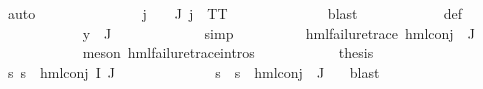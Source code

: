\begin{isabellebody}
\ auto\isanewline
\ \ \ \ \ \ \ \ \isamarkupfalse%
\ {\isachardoublequoteopen}{\isasymPsi}\ {\isacharbackquote}{\kern0pt}\ {\isacharbraceleft}{\kern0pt}{\isacharbraceright}{\kern0pt}\ {\isacharequal}{\kern0pt}\ {\isacharbraceleft}{\kern0pt}{\isacharbraceright}{\kern0pt}{\isachardoublequoteclose}\ {\isachardoublequoteopen}{\isasymforall}j\ {\isasymin}\ {\isasymPsi}\ {\isacharbackquote}{\kern0pt}\ J{\isachardot}{\kern0pt}\ j\ {\isacharequal}{\kern0pt}\ TT{\isachardoublequoteclose}\ \isanewline
\ \ \ \ \ \ \ \ \ \ \ \isamarkupfalse%
\ blast\isanewline
\ \ \ \ \ \ \ \ \ \ \isamarkupfalse%
\ {\isasymPsi}{\isacharunderscore}{\kern0pt}def\ \isanewline
\ \ \ \ \ \ \ \ \ \ \isamarkupfalse%
\ {\isacartoucheopen}y\ {\isasymin}\ {\isasymPhi}{\isacharbackquote}{\kern0pt}J{\isacartoucheclose}\ \isanewline
\ \ \ \ \ \ \ \ \ \ \isamarkupfalse%
\ simp\isanewline
\ \ \ \ \ \ \ \ \isamarkupfalse%
\ {\isachardoublequoteopen}hml{\isacharunderscore}{\kern0pt}failure{\isacharunderscore}{\kern0pt}trace\ {\isacharparenleft}{\kern0pt}hml{\isacharunderscore}{\kern0pt}conj\ {\isacharbraceleft}{\kern0pt}{\isacharbraceright}{\kern0pt}\ J\ {\isasymPsi}{\isacharparenright}{\kern0pt}{\isachardoublequoteclose}\ \isanewline
\ \ \ \ \ \ \ \ \ \ \isamarkupfalse%
\ {\isacharparenleft}{\kern0pt}meson\ hml{\isacharunderscore}{\kern0pt}failure{\isacharunderscore}{\kern0pt}trace{\isachardot}{\kern0pt}intros{\isacharparenleft}{\kern0pt}{}{\isacharparenright}{\kern0pt}{\isacharparenright}{\kern0pt}\isanewline
\ \ \ \ \ \ \ \ \isamarkupfalse%
\ \isamarkupfalse%
\ {\isacharquery}{\kern0pt}thesis\ \isamarkupfalse%
\ {\isacartoucheopen}{\isasymforall}s{\isachardot}{\kern0pt}\ {\isasymnot}s\ {\isasymTurnstile}\ {\isacharparenleft}{\kern0pt}hml{\isacharunderscore}{\kern0pt}conj\ I\ J\ {\isasymPhi}{\isacharparenright}{\kern0pt}{\isacartoucheclose}\ \isanewline
\ \ \ \ \ \ \ \ \ \ \isamarkupfalse%
\ {\isacartoucheopen}{\isasymforall}s{\isachardot}{\kern0pt}\ {\isasymnot}\ s\ {\isasymTurnstile}\ hml{\isacharunderscore}{\kern0pt}conj\ {\isacharbraceleft}{\kern0pt}{\isacharbraceright}{\kern0pt}\ J\ {\isasymPsi}{\isacartoucheclose}\ \isamarkupfalse%
\ blast\isanewline
\ \ \ \ \ \ \isamarkupfalse%
\isanewline
\ \ \ \ \isamarkupfalse%
\isanewline
\ \ \isamarkupfalse%
\ \isanewline
{}\isamarkupfalse%
%
\endisatagproof
{\isafoldproof}%
%
\isadelimproof
\isanewline
%
\endisadelimproof
\isanewline
{}\isamarkupfalse%
\isanewline
%
\isadelimtheory
%
\endisadelimtheory
%
\isatagtheory
{}\isamarkupfalse%
%
\endisatagtheory
{\isafoldtheory}%
%
\isadelimtheory
%
\endisadelimtheory
%
\end{isabellebody}%
